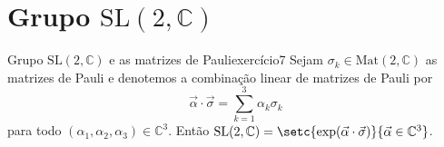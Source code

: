 \section[Grupo SL(2, C)]{Grupo \(\mathrm{SL}(2, \mathbb{C})\)}
\begin{proposition}{Grupo \(\mathrm{SL}(2, \mathbb{C})\) e as matrizes de Pauli}{exercício7}
    Sejam \(\sigma_k \in \mathrm{Mat}(2, \mathbb{C})\) as matrizes de Pauli e denotemos a combinação linear de matrizes de Pauli por
    \begin{equation*}
        \vec{\alpha} \cdot \vec{\sigma} = \sum_{k = 1}^3 \alpha_k \sigma_k
    \end{equation*}
    para todo \((\alpha_1, \alpha_2, \alpha_3) \in \mathbb{C}^3\). Então \(\mathrm{SL}(2,\mathbb{C}) = \setc{\exp(\vec{\alpha}\cdot \vec{\sigma})}{\vec{\alpha} \in \mathbb{C}^3}\).
\end{proposition}
